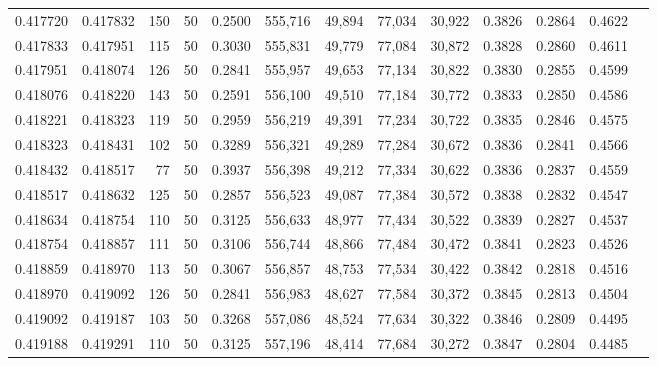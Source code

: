 \begin{tabular}{rrrrrrrrrrrrr}
0.417720 & 0.417832 &   150 &  50 &                                     0.2500 & 555,716 &  49,894 &  77,034 &  30,922 & 0.3826 & 0.2864 & 0.4622 \\
0.417833 & 0.417951 &   115 &  50 &                                     0.3030 & 555,831 &  49,779 &  77,084 &  30,872 & 0.3828 & 0.2860 & 0.4611 \\
0.417951 & 0.418074 &   126 &  50 &                                     0.2841 & 555,957 &  49,653 &  77,134 &  30,822 & 0.3830 & 0.2855 & 0.4599 \\
0.418076 & 0.418220 &   143 &  50 &                                     0.2591 & 556,100 &  49,510 &  77,184 &  30,772 & 0.3833 & 0.2850 & 0.4586 \\
0.418221 & 0.418323 &   119 &  50 &                                     0.2959 & 556,219 &  49,391 &  77,234 &  30,722 & 0.3835 & 0.2846 & 0.4575 \\
0.418323 & 0.418431 &   102 &  50 &                                     0.3289 & 556,321 &  49,289 &  77,284 &  30,672 & 0.3836 & 0.2841 & 0.4566 \\
0.418432 & 0.418517 &    77 &  50 &                                     0.3937 & 556,398 &  49,212 &  77,334 &  30,622 & 0.3836 & 0.2837 & 0.4559 \\
0.418517 & 0.418632 &   125 &  50 &                                     0.2857 & 556,523 &  49,087 &  77,384 &  30,572 & 0.3838 & 0.2832 & 0.4547 \\
0.418634 & 0.418754 &   110 &  50 &                                     0.3125 & 556,633 &  48,977 &  77,434 &  30,522 & 0.3839 & 0.2827 & 0.4537 \\
0.418754 & 0.418857 &   111 &  50 &                                     0.3106 & 556,744 &  48,866 &  77,484 &  30,472 & 0.3841 & 0.2823 & 0.4526 \\
0.418859 & 0.418970 &   113 &  50 &                                     0.3067 & 556,857 &  48,753 &  77,534 &  30,422 & 0.3842 & 0.2818 & 0.4516 \\
0.418970 & 0.419092 &   126 &  50 &                                     0.2841 & 556,983 &  48,627 &  77,584 &  30,372 & 0.3845 & 0.2813 & 0.4504 \\
0.419092 & 0.419187 &   103 &  50 &                                     0.3268 & 557,086 &  48,524 &  77,634 &  30,322 & 0.3846 & 0.2809 & 0.4495 \\
0.419188 & 0.419291 &   110 &  50 &                                     0.3125 & 557,196 &  48,414 &  77,684 &  30,272 & 0.3847 & 0.2804 & 0.4485 \\

\end{tabular}

